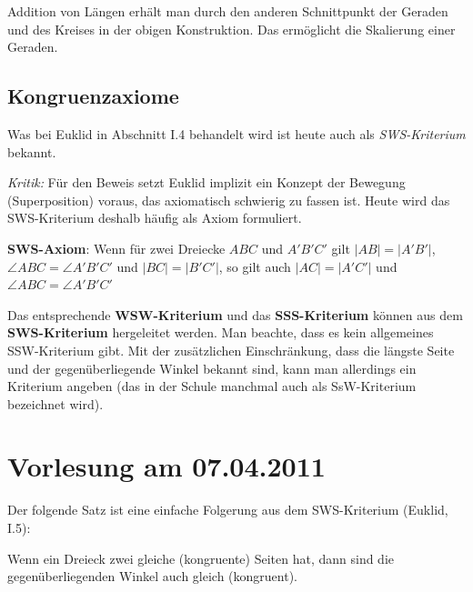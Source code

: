 Addition von Längen erhält man durch den anderen Schnittpunkt der
Geraden und des Kreises in der obigen Konstruktion. Das ermöglicht die
Skalierung einer Geraden. %






\subsection*{Kongruenzaxiome}

Was bei Euklid in Abschnitt I.4 behandelt wird ist heute auch als 
{\em SWS-Kriterium} bekannt. 

{\em Kritik:}
Für den Beweis setzt Euklid
implizit ein Konzept der Bewegung
(Superposition) voraus, das axiomatisch schwierig zu fassen ist.
Heute wird das SWS-Kriterium deshalb häufig als 
Axiom formuliert.


\medskip

\noindent
{\bf SWS-Axiom}: Wenn für zwei Dreiecke $ABC$ und $A'B'C'$ gilt
$|AB|=|A'B'|$, $\angle ABC = \angle A'B'C'$ und $|BC|=|B'C'|$,
so gilt auch $|AC|=|A'C'|$ und $\angle ABC = \angle A'B'C'$

\medskip

Das entsprechende {\bf WSW-Kriterium} und das {\bf SSS-Kriterium} 
können aus dem  {\bf SWS-Kriterium} hergeleitet werden. 
Man beachte, dass es kein allgemeines SSW-Kriterium gibt.
Mit der zusätzlichen Einschränkung, dass die längste Seite und der
gegenüberliegende Winkel bekannt sind, kann man allerdings ein
Kriterium angeben (das in der Schule manchmal auch als 
SsW-Kriterium bezeichnet wird).






\section*{Vorlesung am 07.04.2011}



Der folgende Satz ist eine einfache Folgerung aus dem SWS-Kriterium
(Euklid, I.5):

\begin{thm}
Wenn ein Dreieck zwei gleiche (kongruente) Seiten hat, dann sind die
gegenüberliegenden Winkel auch gleich (kongruent).
\end{thm}

